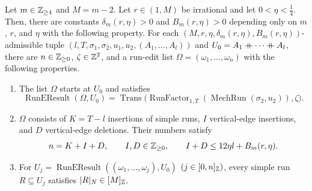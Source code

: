 \begin{lemma}\label{lem:mechanical-edits}
Let $m\in\mathbb Z_{\ge4}$ and $M=m-2$.
Let $r\in(1,M)$ be irrational and let $0<\eta<\frac14$.
Then, there are constants $\delta_m(r,\eta)>0$ and $B_m(r,\eta)>0$ depending only on $m$, $r$, and $\eta$ with the following property.
For each $(M,r,\eta,\delta_m(r,\eta),B_m(r,\eta))$-admissible tuple
$(l,T,\sigma_1,\sigma_2,u_1,u_2,(A_1,\ldots,A_l))$ and $U_0=A_1\mathbin{+\mkern-10mu+}\cdots\mathbin{+\mkern-10mu+} A_l$,
there are $n\in\mathbb Z_{\ge0}$, $\zeta\in\mathbb Z^2$, and a run-edit list $\Omega=(\omega_1,\ldots,\omega_n)$ with the following properties.
\begin{enumerate}
\item\label{c:mechanical-target} The list $\Omega$ starts at $U_0$ and satisfies
\[
 \operatorname{RunEResult}(\Omega,U_0)
 =\operatorname{Trans}\bigl(\operatorname{RunFactor}_{1,T}(\operatorname{MechRun}(\sigma_2,u_2)),\zeta\bigr).
\]
\item\label{c:mechanical-counts} $\Omega$ consists of $K=T-l$ insertions of simple runs,
$I$ vertical-edge insertions, and $D$ vertical-edge deletions. Their numbers satisfy
\begin{equation}\label{eq:mechanical-bound}
 n=K+I+D,\qquad I,D\in\mathbb Z_{\ge0},\qquad I+D\le12\eta l+B_m(r,\eta).
\end{equation}
\item\label{c:mechanical-lengths} For $U_j=\operatorname{RunEResult}((\omega_1,\ldots,\omega_j),U_0)$ $(j\in[0,n]_{\mathbb Z})$,
every simple run $R\subseteq U_j$ satisfies $|R|_N\in[M]_{\mathbb Z}$.
\end{enumerate}
\end{lemma}

